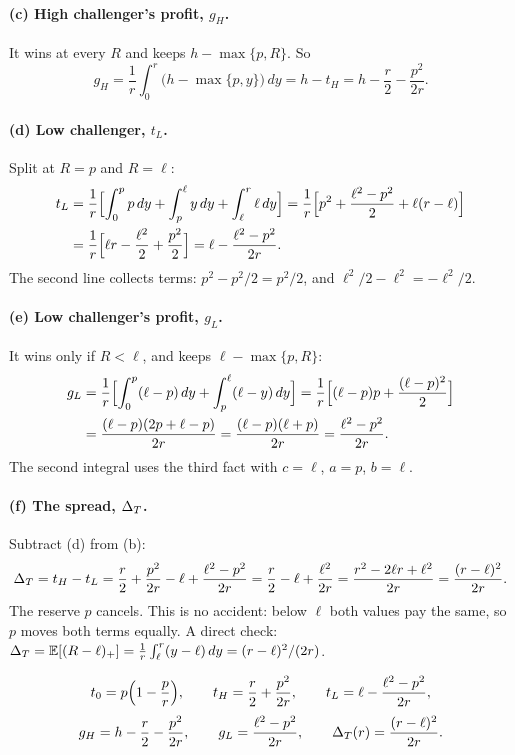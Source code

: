 \paragraph{(c) High challenger's profit, \(g_H\).} It wins at every \(R\) and keeps \(h-\max\{p,R\}\). So
\[
g_H=\frac1r\int_0^r\bigl(h-\max\{p,y\}\bigr)\,dy=h-t_H=h-\frac r2-\frac{p^2}{2r}.
\]

\paragraph{(d) Low challenger, \(t_L\).} Split at \(R=p\) and \(R=\ell\):
\begin{align*}
t_L&=\frac1r\Bigl[\int_0^p p\,dy+\int_p^\ell y\,dy+\int_\ell^r\ell\,dy\Bigr]
=\frac1r\Bigl[p^2+\frac{\ell^2-p^2}{2}+\ell(r-\ell)\Bigr]\\
&=\frac1r\Bigl[\ell r-\frac{\ell^2}{2}+\frac{p^2}{2}\Bigr]=\ell-\frac{\ell^2-p^2}{2r}.
\end{align*}
The second line collects terms: \(p^2-p^2/2=p^2/2\), and \(\ell^2/2-\ell^2=-\ell^2/2\).

\paragraph{(e) Low challenger's profit, \(g_L\).} It wins only if \(R<\ell\), and keeps
\(\ell-\max\{p,R\}\):
\begin{align*}
g_L&=\frac1r\Bigl[\int_0^p(\ell-p)\,dy+\int_p^\ell(\ell-y)\,dy\Bigr]
=\frac1r\Bigl[(\ell-p)p+\frac{(\ell-p)^2}{2}\Bigr]\\
&=\frac{(\ell-p)(2p+\ell-p)}{2r}=\frac{(\ell-p)(\ell+p)}{2r}=\frac{\ell^2-p^2}{2r}.
\end{align*}
The second integral uses the third fact with \(c=\ell\), \(a=p\), \(b=\ell\).

\paragraph{(f) The spread, \(\Delta_T\).} Subtract (d) from (b):
\[
\Delta_T=t_H-t_L=\frac r2+\frac{p^2}{2r}-\ell+\frac{\ell^2-p^2}{2r}=\frac r2-\ell+\frac{\ell^2}{2r}
=\frac{r^2-2\ell r+\ell^2}{2r}=\frac{(r-\ell)^2}{2r}.
\]
The reserve \(p\) cancels. This is no accident: below \(\ell\) both values pay the same, so \(p\) moves
both terms equally. A direct check: \(\Delta_T=\mathbb{E}[(R-\ell)_+]=\frac1r\int_\ell^r(y-\ell)\,dy=(r-\ell)^2/(2r)\).

\begin{resultbox}
\[
t_0=p\Bigl(1-\frac pr\Bigr),\qquad t_H=\frac r2+\frac{p^2}{2r},\qquad t_L=\ell-\frac{\ell^2-p^2}{2r},
\]
\[
g_H=h-\frac r2-\frac{p^2}{2r},\qquad g_L=\frac{\ell^2-p^2}{2r},\qquad \Delta_T(r)=\frac{(r-\ell)^2}{2r}.
\]
\end{resultbox}

